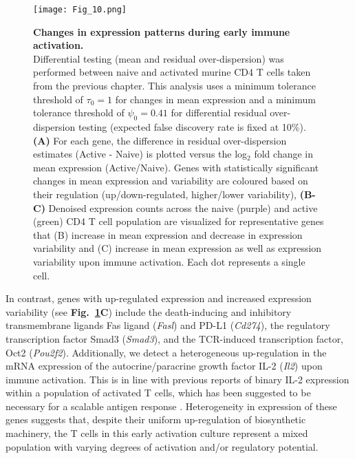 \begin{figure}[!h]
\centering
\texttt{[image: Fig\_10.png]}
\caption[Changes in expression patterns during early immune activation]{\textbf{Changes in expression patterns during early immune activation.}\\
Differential testing (mean and residual over-dispersion) was performed between naive and activated murine CD4\plus{} T cells taken from the previous chapter. This analysis uses a minimum tolerance threshold of $\tau_0=1$ for changes in mean expression and a minimum tolerance threshold of $\psi_0=0.41$ for differential residual over-dispersion testing (expected false discovery rate is fixed at 10\%). \textbf{(A)} For each gene, the difference in residual over-dispersion estimates (Active - Naive) is plotted versus the log$_2$ fold change in mean expression (Active/Naive). Genes with statistically significant changes in mean expression and variability are coloured based on their regulation (up/down-regulated, higher/lower variability), \textbf{(B-C)} Denoised expression counts across the naive (purple) and active (green) CD4\plus{} T cell population are visualized for representative genes that (B) increase in mean expression and decrease in expression variability and (C) increase in mean expression as well as expression variability  upon immune activation. Each dot represents a single cell.}
\label{fig2:immune_activation}
\end{figure}

\newpage

In contrast, genes with up-regulated expression and increased expression variability (see \textbf{Fig.~\ref{fig2:immune_activation}C}) include the death-inducing and inhibitory transmembrane ligands Fas ligand (\textit{Fasl}) and PD-L1 (\textit{Cd274}), the regulatory transcription factor Smad3 (\textit{Smad3}), and the TCR-induced transcription factor, Oct2 (\textit{Pou2f2}). Additionally, we detect a heterogeneous up-regulation in the mRNA expression of the autocrine/paracrine growth factor IL-2 (\textit{Il2}) upon immune activation. This is in line with previous reports of binary IL-2 expression within a population of activated T cells, which has been suggested to be necessary for a scalable antigen response \citep{Fuhrmann2016}. Heterogeneity in expression of these genes suggests that, despite their uniform up-regulation of biosynthetic machinery, the T cells in this early activation culture represent a mixed population with varying degrees of activation and/or regulatory potential. \\

